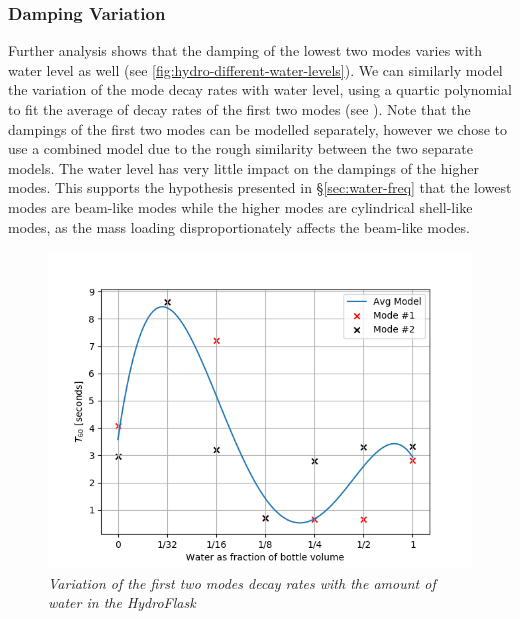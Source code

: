 \documentclass[twoside,a4paper]{article}
\begin{document}
\subsubsection{Damping Variation} \label{sec:water-damp}
%
Further analysis shows that the damping of the lowest two modes
varies with water level as well (see \cref{fig:hydro-different-water-levels}). We can similarly model the
variation of the mode decay rates with water level, using a
quartic polynomial to fit the average of decay rates of the first
two modes (see ). Note that the dampings
of the first two modes can be modelled separately, however we chose
to use a combined model due to the rough similarity between the
two separate models. The water level has very little impact on the dampings of the higher modes. This supports the hypothesis presented in \S\ref{sec:water-freq} that the lowest modes are beam-like modes while the higher modes are cylindrical shell-like modes, as the mass loading disproportionately affects the beam-like modes. 
%
\begin{figure}[!t]
    \centering
    \includegraphics[width=\linewidth,trim={0 0 1cm 1cm},clip]{../Figures/Water_Damping}
    \caption{\it{Variation of the first two modes decay rates
                 with the amount of water in the HydroFlask}}
    \label{fig:water-mode-damp}
\end{figure}
%
\end{document}
